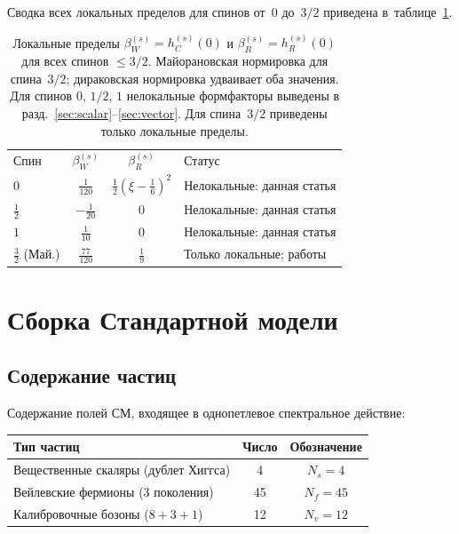 \documentclass[aps,prd,twocolumn,superscriptaddress,nofootinbib,floatfix]{revtex4-2}
\theoremstyle{definition}
\theoremstyle{remark}
\begin{document}
Сводка всех локальных пределов для спинов от~$0$ до~$3/2$ приведена
в~таблице~\ref{tab:all-spins}.

\begin{table}[t]
\caption{Локальные пределы $\beta_W^{(s)} = h_C^{(s)}(0)$ и
$\beta_R^{(s)} = h_R^{(s)}(0)$ для всех спинов $\leq 3/2$. Майорановская
нормировка для спина~$3/2$; дираковская нормировка удваивает оба значения.
Для спинов $0$, $1/2$, $1$ нелокальные формфакторы выведены в
разд.~\ref{sec:scalar}--\ref{sec:vector}. Для спина~$3/2$ приведены
только локальные пределы.}
\label{tab:all-spins}
\begin{ruledtabular}
\begin{tabular}{lccl}
Спин & $\beta_W^{(s)}$ & $\beta_R^{(s)}$ & Статус \\
\colrule
$0$ & $\frac{1}{120}$ & $\frac{1}{2}(\xi - \frac{1}{6})^2$ &
  Нелокальные: данная статья \\[3pt]
$\frac{1}{2}$ & $-\frac{1}{20}$ & $0$ &
  Нелокальные: данная статья \\[3pt]
$1$ & $\frac{1}{10}$ & $0$ &
  Нелокальные: данная статья \\[3pt]
$\frac{3}{2}$ (Май.) & $\frac{77}{120}$ & $\frac{1}{9}$ &
  Только локальные; работы~\cite{KaranPanda:2021,ChristensenDuff:1979} \\
\end{tabular}
\end{ruledtabular}
\end{table}


\section{Сборка Стандартной модели}
\label{sec:sm}

\subsection{Содержание частиц}

Содержание полей СМ, входящее в однопетлевое спектральное действие:
\begin{center}
\renewcommand{\arraystretch}{1.2}
\begin{tabular}{@{}lcc@{}}
  \toprule
  Тип частиц & Число & Обозначение \\
  \midrule
  Вещественные скаляры (дублет Хиггса) & 4 & $N_s = 4$ \\
  Вейлевские фермионы (3 поколения) & 45 & $N_f = 45$ \\
  Калибровочные бозоны ($8+3+1$) & 12 & $N_v = 12$ \\
  \bottomrule
\end{tabular}
\end{center}
\end{document}
